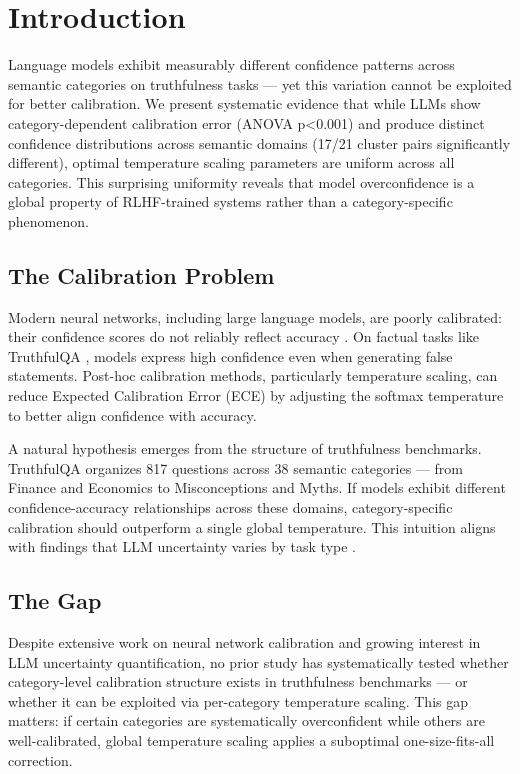\section{Introduction}

Language models exhibit measurably different confidence patterns across semantic categories on truthfulness tasks --- yet this variation cannot be exploited for better calibration. We present systematic evidence that while LLMs show category-dependent calibration error (ANOVA p<0.001) and produce distinct confidence distributions across semantic domains (17/21 cluster pairs significantly different), optimal temperature scaling parameters are uniform across all categories. This surprising uniformity reveals that model overconfidence is a global property of RLHF-trained systems rather than a category-specific phenomenon.

\subsection{The Calibration Problem}

Modern neural networks, including large language models, are poorly calibrated: their confidence scores do not reliably reflect accuracy \citep{guo2017calibration}. On factual tasks like TruthfulQA \citep{lin2022truthfulqa}, models express high confidence even when generating false statements. Post-hoc calibration methods, particularly temperature scaling, can reduce Expected Calibration Error (ECE) by adjusting the softmax temperature to better align confidence with accuracy.

A natural hypothesis emerges from the structure of truthfulness benchmarks. TruthfulQA organizes 817 questions across 38 semantic categories --- from Finance and Economics to Misconceptions and Myths. If models exhibit different confidence-accuracy relationships across these domains, category-specific calibration should outperform a single global temperature. This intuition aligns with findings that LLM uncertainty varies by task type \citep{xiong2023uncertainty}.

\subsection{The Gap}

Despite extensive work on neural network calibration and growing interest in LLM uncertainty quantification, no prior study has systematically tested whether category-level calibration structure exists in truthfulness benchmarks --- or whether it can be exploited via per-category temperature scaling. This gap matters: if certain categories are systematically overconfident while others are well-calibrated, global temperature scaling applies a suboptimal one-size-fits-all correction.

